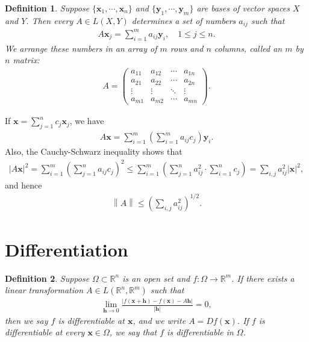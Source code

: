 \documentclass[10pt]{book}
\newtheorem{definition}{Definition}[chapter]
\theoremstyle{definition}
\numberwithin{equation}{chapter}
\begin{document}
\begin{definition}
Suppose $\{\mathbf{x}_1, \cdots, \mathbf{x}_n\}$ and $\{\mathbf{y}_1, \cdots, \mathbf{y}_m\}$ are bases of vector spaces $X$ and $Y$. Then every $A \in L(X,Y)$ determines a set of numbers $a_{ij}$ such that
\begin{align*}
    A\mathbf{x}_j = \sum^m_{i=1} a_{ij} \mathbf{y}_i, \quad 1 \leq j \leq n.
\end{align*}
We arrange these numbers in an array of $m$ rows and $n$ columns, called an $m$ by $n$ matrix:
\begin{align*}
    A = \begin{pmatrix}
        a_{11} & a_{12} & \cdots & a_{1n} \\
        a_{21} & a_{22} & \cdots & a_{2n} \\
        \vdots & \vdots & \ddots & \vdots \\
        a_{m1} & a_{m2} & \cdots & a_{mn}
    \end{pmatrix}.
\end{align*}
\end{definition}

\medskip

If $\mathbf{x} = \sum^n_{j=1} c_j \mathbf{x}_j$, we have
\begin{align*}
    A\mathbf{x} = \sum^m_{i=1} \left(\sum^m_{i=1} a_{ij} c_j\right) \mathbf{y}_i.
\end{align*}
Also, the Cauchy-Schwarz inequality shows that
\begin{align*}
    \left|A\mathbf{x}\right|^2 = \sum^m_{i=1} \left(\sum^n_{j=1} a_{ij} c_j\right)^2 \leq \sum^m_{i=1} \left(\sum^n_{j=1} a_{ij}^2 \cdot \sum^n_{i=1} c_j\right) = \sum_{i,j} a_{ij}^2 \left|\mathbf{x}\right|^2,
\end{align*}
and hence
\begin{align*}
    \left\|A\right\| \leq \left(\sum_{i,j} a_{ij}^2\right)^{1/2}.
\end{align*}

\medskip


\section{Differentiation}

\begin{definition}\label{def_76}
Suppose $\Omega \subset \mathbb{R}^n$ is an open set and $f: \Omega \to \mathbb{R}^m$. If there exists a linear transformation $A \in L(\mathbb{R}^n,\mathbb{R}^m)$ such that
\begin{align}\label{def_76_equ1}
    \lim_{\mathbf{h}\to 0} \frac{\left|f(\mathbf{x} + \mathbf{h}) - f(\mathbf{x}) - A\mathbf{h}\right|}{\left|\mathbf{h}\right|} = 0,
\end{align}
then we say $f$ is differentiable at $\mathbf{x}$, and we write $A = Df(\mathbf{x})$. If $f$ is differentiable at every $\mathbf{x} \in \Omega$, we say that $f$ is differentiable in $\Omega$.
\end{definition}
\end{document}
